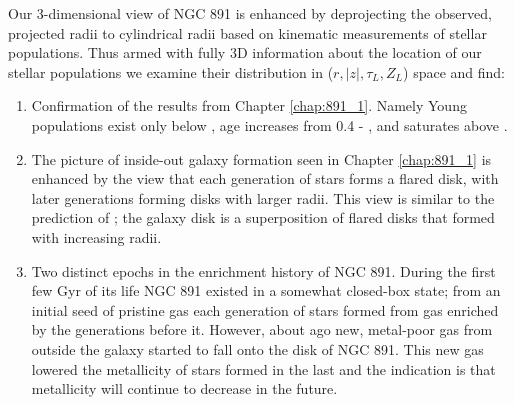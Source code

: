 

Our 3-dimensional view of NGC 891 is enhanced by deprojecting the
observed, projected radii to cylindrical radii based on kinematic
measurements of stellar populations. Thus armed with fully 3D
information about the location of our stellar populations we examine
their distribution in ($r,|z|,\tau_L,Z_L$) space and find:


\begin{enumerate}

\item Confirmation of the results from Chapter
  \ref{chap:891_1}. Namely Young populations exist only below
  , age increases from 0.4 - , and saturates
  above .

\item The picture of inside-out galaxy formation seen in Chapter
  \ref{chap:891_1} is enhanced by the view that each generation of
  stars forms a flared disk, with later generations forming disks with
  larger radii. This view is similar to the prediction of
  \citet{Martig14a}; the galaxy disk is a superposition of flared
  disks that formed with increasing radii.

\item Two distinct epochs in the enrichment history of NGC 891. During
  the first few Gyr of its life NGC 891 existed in a somewhat
  closed-box state; from an initial seed of pristine gas each
  generation of stars formed from gas enriched by the generations
  before it. However, about  ago new, metal-poor gas
  from outside the galaxy started to fall onto the disk of NGC
  891. This new gas lowered the metallicity of stars formed in the last
   and the indication is that metallicity will continue
  to decrease in the future.

\end{enumerate}


